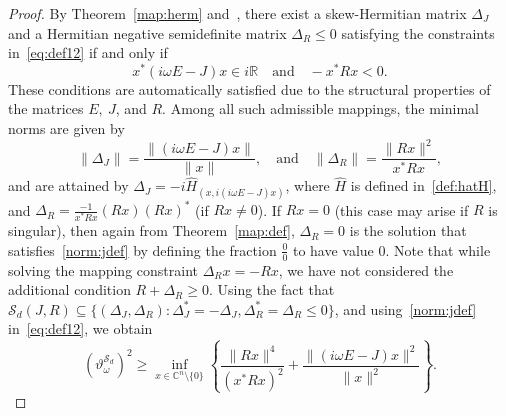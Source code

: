 \documentclass[11pt]{article}
\newcommand{\C}{\mathbb C}
\begin{document}
\begin{proof}
    By Theorem~\ref{map:herm} and~\cite[Theorem~2.3]{MehMS16}, there exist a skew-Hermitian matrix $\Delta_J$ and a Hermitian negative semidefinite matrix $\Delta_R\le 0$ satisfying the constraints in~\eqref{eq:def12} if and only if
    \[
    x^*(i\omega E - J)x \in i\mathbb{R}
    \quad \text{and} \quad
    -x^*Rx<0.
    \]
    These conditions are automatically satisfied due to the structural properties of the matrices $E,~J$, and $R$.
    Among all such admissible mappings, the minimal norms are given by
    \begin{equation}\label{norm:jdef}
		\|\Delta_J\|=\frac{\|(i\omega E - J)x\|}{\|x\|}, \quad \text{and} \quad
		\|\Delta_R\|=\frac{\|Rx\|^2}{x^*Rx},
	\end{equation}
    and are attained by $\Delta_J=-i \hat H_{(x, i(i\omega E-J)x)}$, where $\hat H$ is defined in~\eqref{def:hatH}, and $\Delta_R=\frac{-1}{x^*Rx}(Rx)(Rx)^*$ (if $Rx\neq 0$). If $Rx=0$ (this case may arise if $R$ is singular), then again from {Theorem~\ref{map:def}}, $\Delta_R=0$ is the solution that satisfies~\eqref{norm:jdef} by defining the fraction $\frac{0}{0}$ to have value $0$. Note that while solving the mapping constraint $\Delta_Rx=-Rx$, we have not considered the additional condition $R+\Delta_R\geq 0$. Using the fact that $\mathcal S_d(J,R)\subseteq \{(\Delta_J,\Delta_R): \Delta_J^*=-\Delta_J, \Delta_R^*=\Delta_R\leq 0\}$, and using~\eqref{norm:jdef} in~\eqref{eq:def12}, we obtain
	\begin{equation}\label{eq:def2}
		(\vartheta^{\mathcal S_d}_{\omega})^2\geq \inf_{x\in\C^{n}\setminus\{0\}} \left\{ \frac{\|Rx\|^4}{(x^*Rx)^2}+\frac{\|(i\omega E - J)x\|^2}{\|x\|^2} \right\}.
	\end{equation}

\end{proof}
\end{document}
